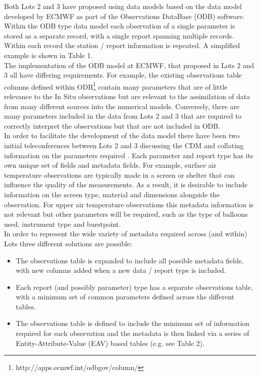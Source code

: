 \documentclass[a4paper]{article}
\begin{document}
Both Lots 2 and 3 have proposed using data models based on the data model developed by ECMWF as part of the Observations DataBase (ODB) software. Within the ODB type data model each observation of a single parameter is stored as a separate record, with a single report spanning multiple records. Within each record the station / report information is repeated. A simplified example is shown in Table 1.\\



The implementation of the ODB model at ECMWF, that proposed in Lots 2 and 3 all have differing requirements. For example, the existing observations table columns defined within ODB\footnote{http://apps.ecmwf.int/odbgov/column/}  contain many parameters that are of little relevance to the In Situ observations but are relevant to the assimilation of data from many different sources into the numerical models. Conversely, there are many parameters included in the data from Lots 2 and 3 that are required to correctly interpret the observations but that are not included in ODB. \\

In order to facilitate the development of the data model there have been two initial teleconferences between Lots 2 and 3 discussing the CDM and collating information on the parameters required . Each parameter and report type has its own unique set of fields and metadata fields. For example, surface air temperature observations are typically made in a screen or shelter that can influence the quality of the measurements. As a result, it is desirable to include information on the screen type, material and dimensions alongside the observation. For upper air temperature observations this metadata information is not relevant but other parameters will be required, such as the type of balloons used, instrument type and burstpoint.\\

In order to represent the wide variety of metadata required across (and within) Lots three different solutions are possible:\\
\begin{itemize}
\item The observations table is expanded to include all possible metadata fields, with new columns added when a new data / report type is included.
\item Each report (and possibly parameter) type has a separate observations table, with a minimum set of common parameters defined across the different tables.
\item The observations table is defined to include the minimum set of information required for each observation and the metadata is then linked via a series of Entity-Attribute-Value (EAV) based tables (e.g. see Table 2).
\end{itemize}
\end{document}
